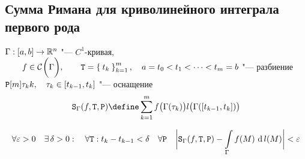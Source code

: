 \subsection{Сумма Римана для криволинейного интеграла первого рода}

\begin{definition}
	$ \Gamma : [a, b] \to \R^n $ "--- $ C^1 $-кривая, $ \qquad f \in \Cont\Gamma, \qquad \Teq = \seq[m]{t_k}k, \quad a = t_0 < t_1 < \dots < t_m = b $ "--- разбиение \\
	$ \Par[m]{\tau_k}k, \quad \tau_k \in [t_{k - 1}, t_k] $ "--- оснащение
	$$ \Sr_\Gamma (f, \Teq, \Par) \define \sum_{k = 1}^m f \big( \Gamma(\tau_k) \big) l \big( \Gamma([t_{k - 1}, t_k]) \big) $$
\end{definition}

\begin{theorem}
	$$ \forall \veps > 0 \quad \exist \delta > 0 : \quad \forall \Teq : t_k - t_{k - 1} < \delta \quad \forall \Par \quad \bigg| \Sr_\Gamma(f, \Teq, \Par) - \cint\Gamma{f(M)} \bigg| < \veps $$
\end{theorem}

